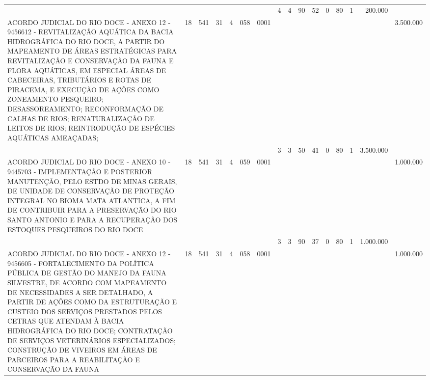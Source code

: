 \documentclass{article}
\begin{document}
\begin{longtable}[c]{m{6.5cm}|m{1pt}m{1pt}m{1pt}m{1pt}m{1pt}m{1pt}|m{1pt}m{1pt}m{0.5pt}m{1pt}|m{1pt}|m{1pt}m{1pt}|m{1pt}|m{2pt}}
& & & & & & & \multicolumn{1}{c}{ 4 } & \multicolumn{1}{c}{ 4 } & \multicolumn{1}{c}{ 90 } & \multicolumn{1}{c|}{ 52 } & \multicolumn{1}{c|}{ 0 } & \multicolumn{1}{l}{ 80 } & \multicolumn{1}{c|}{ 1 } & \multicolumn{1}{r|}{ 200.000 } & \\
\multicolumn{1}{L{5.5cm}|}{ ACORDO JUDICIAL DO RIO DOCE - ANEXO 12 - 9456612 - REVITALIZAÇÃO AQUÁTICA DA BACIA HIDROGRÁFICA DO RIO DOCE, A PARTIR DO MAPEAMENTO DE ÁREAS ESTRATÉGICAS PARA REVITALIZAÇÃO E CONSERVAÇÃO DA FAUNA E FLORA AQUÁTICAS, EM ESPECIAL ÁREAS DE CABECEIRAS, TRIBUTÁRIOS E ROTAS DE PIRACEMA, E EXECUÇÃO DE AÇÕES COMO ZONEAMENTO PESQUEIRO; DESASSOREAMENTO; RECONFORMAÇÃO DE CALHAS DE RIOS; RENATURALIZAÇÃO DE LEITOS DE RIOS; REINTRODUÇÃO DE ESPÉCIES AQUÁTICAS AMEAÇADAS; } & \multicolumn{1}{c}{ 18 } & \multicolumn{1}{c}{ 541 } & \multicolumn{1}{c}{ 31 } & \multicolumn{1}{l}{ 4 } & \multicolumn{1}{c}{ 058 } & \multicolumn{1}{l|}{ 0001 } & & & & & & & & & \multicolumn{1}{r}{ 3.500.000 } \\
& & & & & & & \multicolumn{1}{c}{ 3 } & \multicolumn{1}{c}{ 3 } & \multicolumn{1}{c}{ 50 } & \multicolumn{1}{c|}{ 41 } & \multicolumn{1}{c|}{ 0 } & \multicolumn{1}{l}{ 80 } & \multicolumn{1}{c|}{ 1 } & \multicolumn{1}{r|}{ 3.500.000 } & \\
\multicolumn{1}{L{5.5cm}|}{ ACORDO JUDICIAL DO RIO DOCE - ANEXO 10 - 9445703 - IMPLEMENTAÇÃO E POSTERIOR MANUTENÇÃO, PELO ESTDO DE MINAS GERAIS, DE UNIDADE DE CONSERVAÇÃO DE PROTEÇÃO INTEGRAL NO BIOMA MATA ATLANTICA, A FIM DE CONTRIBUIR PARA A PRESERVAÇÃO DO RIO SANTO ANTONIO E PARA A RECUPERAÇÃO DOS ESTOQUES PESQUEIROS DO RIO DOCE } & \multicolumn{1}{c}{ 18 } & \multicolumn{1}{c}{ 541 } & \multicolumn{1}{c}{ 31 } & \multicolumn{1}{l}{ 4 } & \multicolumn{1}{c}{ 059 } & \multicolumn{1}{l|}{ 0001 } & & & & & & & & & \multicolumn{1}{r}{ 1.000.000 } \\
& & & & & & & \multicolumn{1}{c}{ 3 } & \multicolumn{1}{c}{ 3 } & \multicolumn{1}{c}{ 90 } & \multicolumn{1}{c|}{ 37 } & \multicolumn{1}{c|}{ 0 } & \multicolumn{1}{l}{ 80 } & \multicolumn{1}{c|}{ 1 } & \multicolumn{1}{r|}{ 1.000.000 } & \\
\multicolumn{1}{L{5.5cm}|}{ ACORDO JUDICIAL DO RIO DOCE - ANEXO 12 - 9456605 - FORTALECIMENTO DA POLÍTICA PÚBLICA DE GESTÃO DO MANEJO DA FAUNA SILVESTRE, DE ACORDO COM MAPEAMENTO DE NECESSIDADES A SER DETALHADO, A PARTIR DE AÇÕES COMO DA ESTRUTURAÇÃO E CUSTEIO DOS SERVIÇOS PRESTADOS PELOS CETRAS QUE ATENDAM À BACIA HIDROGRÁFICA DO RIO DOCE; CONTRATAÇÃO DE SERVIÇOS VETERINÁRIOS ESPECIALIZADOS; CONSTRUÇÃO DE VIVEIROS EM ÁREAS DE PARCEIROS PARA A REABILITAÇÃO E CONSERVAÇÃO DA FAUNA } & \multicolumn{1}{c}{ 18 } & \multicolumn{1}{c}{ 541 } & \multicolumn{1}{c}{ 31 } & \multicolumn{1}{l}{ 4 } & \multicolumn{1}{c}{ 058 } & \multicolumn{1}{l|}{ 0001 } & & & & & & & & & \multicolumn{1}{r}{ 1.000.000 } \\

\end{longtable}
\end{document}
